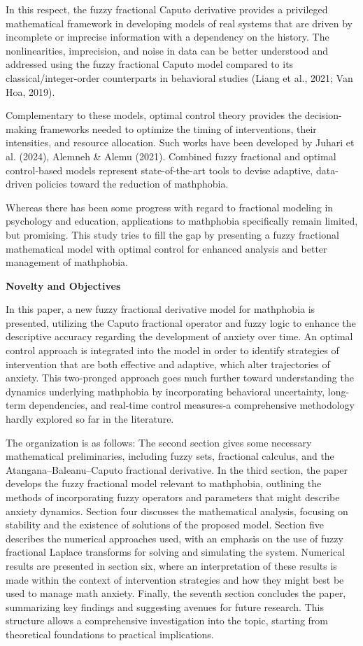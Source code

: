 \documentclass[
]{article}
\begin{document}
In this respect, the fuzzy fractional Caputo derivative provides a privileged mathematical framework in developing models of real systems that are driven by incomplete or imprecise information with a dependency on the history. The nonlinearities, imprecision, and noise in data can be better understood and addressed using the fuzzy fractional Caputo model compared to its classical/integer-order counterparts in behavioral studies (Liang et al., 2021; Van Hoa, 2019).

Complementary to these models, optimal control theory provides the decision-making frameworks needed to optimize the timing of interventions, their intensities, and resource allocation. Such works have been developed by Juhari et al. (2024), Alemneh \& Alemu (2021). Combined fuzzy fractional and optimal control-based models represent state-of-the-art tools to devise adaptive, data-driven policies toward the reduction of mathphobia.

Whereas there has been some progress with regard to fractional modeling in psychology and education, applications to mathphobia specifically remain limited, but promising. This study tries to fill the gap by presenting a fuzzy fractional mathematical model with optimal control for enhanced analysis and better management of mathphobia.

\textbf{Novelty and Objectives}

In this paper, a new fuzzy fractional derivative model for mathphobia is presented, utilizing the Caputo fractional operator and fuzzy logic to enhance the descriptive accuracy regarding the development of anxiety over time. An optimal control approach is integrated into the model in order to identify strategies of intervention that are both effective and adaptive, which alter trajectories of anxiety. This two-pronged approach goes much further toward understanding the dynamics underlying mathphobia by incorporating behavioral uncertainty, long-term dependencies, and real-time control measures-a comprehensive methodology hardly explored so far in the literature.

The organization is as follows: The second section gives some necessary mathematical preliminaries, including fuzzy sets, fractional calculus, and the Atangana--Baleanu--Caputo fractional derivative. In the third section, the paper develops the fuzzy fractional model relevant to mathphobia, outlining the methods of incorporating fuzzy operators and parameters that might describe anxiety dynamics. Section four discusses the mathematical analysis, focusing on stability and the existence of solutions of the proposed model. Section five describes the numerical approaches used, with an emphasis on the use of fuzzy fractional Laplace transforms for solving and simulating the system. Numerical results are presented in section six, where an interpretation of these results is made within the context of intervention strategies and how they might best be used to manage math anxiety. Finally, the seventh section concludes the paper, summarizing key findings and suggesting avenues for future research. This structure allows a comprehensive investigation into the topic, starting from theoretical foundations to practical implications.
\end{document}
